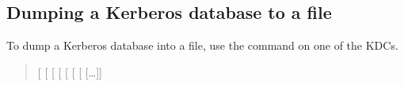 \documentclass[letterpaper,10pt,english]{sphinxmanual}
\begin{document}
\subsection{Dumping a Kerberos database to a file}
\label{\detokenize{admin/database:dumping-a-kerberos-database-to-a-file}}
To dump a Kerberos database into a file, use the {\hyperref[\detokenize{admin/admin_commands/kdb5_util:kdb5-util-8}]{}}
 command on one of the KDCs.
\begin{quote}

 {[}\textbar{}\textbar{}\sphinxstylestrong{-r18}{]}
{[}\sphinxstylestrong{-verbose}{]} {[}\sphinxstylestrong{-mkey\_convert}{]} {[}
\sphinxstyleemphasis{mkey\_file}{]} {[}\sphinxstylestrong{-rev}{]} {[}\sphinxstylestrong{-recurse}{]} {[}
{[}…{]}{]}
\end{quote}
\end{document}
